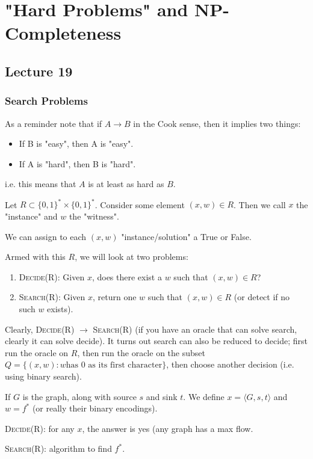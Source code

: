 \section{"Hard Problems" and NP-Completeness}
\subsection{Lecture 19}
\subsubsection{Search Problems}

As a reminder note that if $A \to B$ in the Cook sense,
then it implies two things:
\begin{itemize}
    \item If B is "easy", then A is "easy".
    \item If A is "hard", then B is "hard".
\end{itemize}
i.e. this means that $A$ is at least as hard as $B$.

\begin{definition}
    Let $R \subset \{0, 1\}^* \times \{0, 1\}^*$. Consider some element
    $(x, w) \in R$. Then we call $x$ the "instance" and $w$ the "witness".

    We can assign to each $(x, w)$ "instance/solution" a True or False.
\end{definition}

Armed with this $R$, we will look at two problems:
\begin{enumerate}
    \item \textsc{Decide(R)}: Given $x$, does there exist a $w$ such that $(x, w) \in R$?
    \item \textsc{Search(R)}: Given $x$, return one $w$ such that $(x, w) \in R$ (or detect if no such $w$ exists).
\end{enumerate}

Clearly, \textsc{Decide(R)} $\to$ \textsc{Search(R)} (if you have an oracle
that can solve search, clearly it can solve decide). It turns out search can also be reduced to decide;
first run the oracle on $R$, then run the oracle on the subset $Q = \{ (x, w) : w \text{has 0 as its first character} \}$, then choose another decision
(i.e. using binary search).

\begin{example}
    If $G$ is the graph, along with source $s$ and sink $t$. 
    We define $x = \langle G, s, t \rangle$ and $w = f^*$ (or really their binary encodings).

    \textsc{Decide(R)}: for any $x$, the answer is yes (any graph has a max flow.

    \textsc{Search(R)}: algorithm to find $f^*$.
\end{example}

